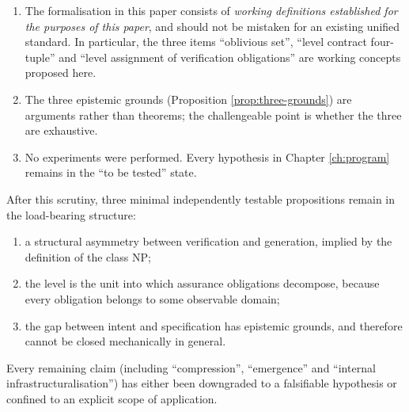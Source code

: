 \begin{enumerate}[label=(L\arabic*)]
      A second, formal round followed the two external reviews of this report and
      is worth recording because its result was largely negative. Three claims that had been
      developed for this report---that the two boundary criteria are two bounds on one kernel, that
      the completeness of an abstraction is not preserved by composition, and that soundness is best
      read as a lax coalgebra morphism---were found on checking to be, respectively, a restatement
      of a published notion under a name that inverts the published one, a published theorem, and a
      published definition. A fourth, an attempt to sharpen the composition condition, was found to
      be false and is refuted in the machine-checked companion development. What survived is
      narrower and is stated in \S\ref{sec:enrichment}; the references added by that round are
      listed in the bibliography. The episode is recorded here rather than quietly dropped because
      it is the strongest available evidence for the claim of Principle \ref{pr:boundary} that the framework's
      guarantees are boundary properties: the errors were all found at the boundary between this
      report and the literature, not inside the report's own arguments.
\item The formalisation in this paper consists of \emph{working definitions established for
      the purposes of this paper}, and should not be mistaken for an existing unified
      standard. In particular, the three items ``oblivious set'', ``level contract
      four-tuple'' and ``level assignment of verification obligations'' are working
      concepts proposed here.
\item The three epistemic grounds (Proposition \ref{prop:three-grounds}) are arguments
      rather than theorems; the challengeable point is whether the three are exhaustive.
\item No experiments were performed. Every hypothesis in Chapter \ref{ch:program} remains
      in the ``to be tested'' state.
\end{enumerate}

\begin{principle}\label{pr:self-audit}
After this scrutiny, three minimal independently testable propositions remain in the
load-bearing structure:
\begin{enumerate}[label=(\roman*)]
\item a structural asymmetry between verification and generation, implied by the definition
      of the class $\mathrm{NP}$;
\item the level is the unit into which assurance obligations decompose, because every
      obligation belongs to some observable domain;
\item the gap between intent and specification has epistemic grounds, and therefore cannot
      be closed mechanically in general.
\end{enumerate}
Every remaining claim (including ``compression'', ``emergence'' and ``internal
infrastructuralisation'') has either been downgraded to a falsifiable hypothesis or
confined to an explicit scope of application.
\end{principle}

